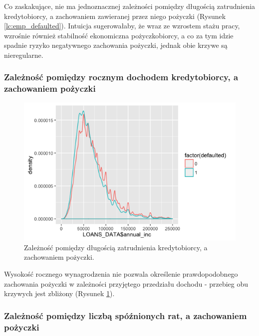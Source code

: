 Co zaskakujące, nie ma jednoznacznej zależności pomiędzy długością zatrudnienia kredytobiorcy, a zachowaniem zawieranej przez niego pożyczki (Rysunek \ref{lc:emp_defaulted}). Intuicja sugerowałaby, że wraz ze wzrostem stażu pracy, wzrośnie również stabilność ekonomiczna pożyczkobiorcy, a co za tym idzie spadnie ryzyko negatywnego zachowania pożyczki, jednak obie krzywe są nieregularne.

\subsubsection{Zależność pomiędzy rocznym dochodem kredytobiorcy, a zachowaniem pożyczki}

\begin{figure}[H] \centering %
	\includegraphics[scale=0.7]{img/inc_defaulted.png}
	\caption{Zależność pomiędzy długością zatrudnienia kredytobiorcy, a zachowaniem pożyczki.}
	\label{lc:inc_defaulted}
\end{figure}

Wysokość rocznego wynagrodzenia nie pozwala określenie prawdopodobnego zachowania pożyczki w zależności przyjętego przedziału dochodu - przebieg obu krzywych jest zbliżony (Rysunek \ref{lc:inc_defaulted}).

\subsubsection{Zależność pomiędzy liczbą spóźnionych rat, a zachowaniem pożyczki}

